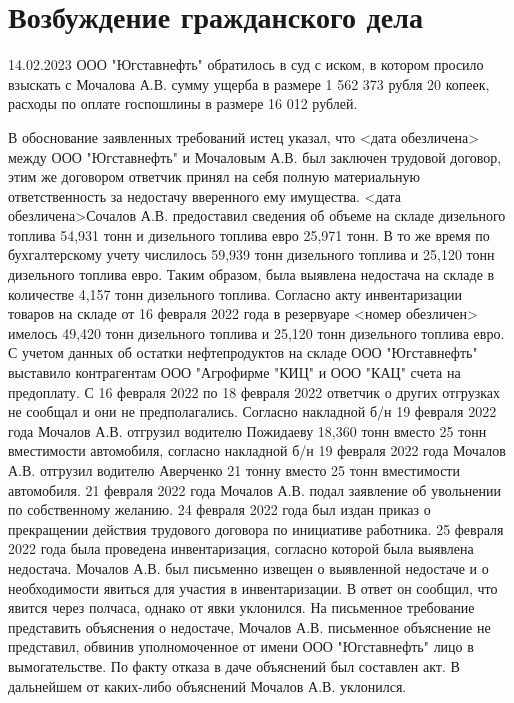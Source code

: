 \documentclass[a4paper]{article}
\begin{document}
	\thispagestyle{empty}
	
	
	
	\newpage
	
	\tableofcontents
	
	\pagestyle{plain}
	
	\newpage
	
	\section{Возбуждение гражданского дела}
		14.02.2023 ООО "Югставнефть" обратилось в суд с иском, в котором просило взыскать с Мочалова А.В. сумму ущерба в размере 1 562 373 рубля 20 копеек, расходы по оплате госпошлины в размере 16 012 рублей.
		
		В обоснование заявленных требований истец указал, что <дата обезличена> между ООО "Югставнефть" и Мочаловым А.В. был заключен трудовой договор, этим же договором ответчик принял на себя полную материальную ответственность за недостачу вверенного ему имущества. <дата обезличена>Сочалов А.В. предоставил сведения об объеме на складе дизельного топлива 54,931 тонн и дизельного топлива евро 25,971 тонн. В то же время по бухгалтерскому учету числилось 59,939 тонн дизельного топлива и 25,120 тонн дизельного топлива евро. Таким образом, была выявлена недостача на складе в количестве 4,157 тонн дизельного топлива. Согласно акту инвентаризации товаров на складе от 16 февраля 2022 года в резервуаре <номер обезличен> имелось 49,420 тонн дизельного топлива и 25,120 тонн дизельного топлива евро. С учетом данных об остатки нефтепродуктов на складе ООО "Югставнефть" выставило контрагентам ООО "Агрофирме "КИЦ" и ООО "КАЦ" счета на предоплату. С 16 февраля 2022 по 18 февраля 2022 ответчик о других отгрузках не сообщал и они не предполагались. Согласно накладной б/н 19 февраля 2022 года Мочалов А.В. отгрузил водителю Пожидаеву 18,360 тонн вместо 25 тонн вместимости автомобиля, согласно накладной б/н 19 февраля 2022 года Мочалов А.В. отгрузил водителю Аверченко 21 тонну вместо 25 тонн вместимости автомобиля. 21 февраля 2022 года Мочалов А.В. подал заявление об увольнении по собственному желанию. 24 февраля 2022 года был издан приказ о прекращении действия трудового договора по инициативе работника. 25 февраля 2022 года была проведена инвентаризация, согласно которой была выявлена недостача. Мочалов А.В. был письменно извещен о выявленной недостаче и о необходимости явиться для участия в инвентаризации. В ответ он сообщил, что явится через полчаса, однако от явки уклонился. На письменное требование представить объяснения о недостаче, Мочалов А.В. письменное объяснение не представил, обвинив уполномоченное от имени ООО "Югставнефть" лицо в вымогательстве. По факту отказа в даче объяснений был составлен акт. В дальнейшем от каких-либо объяснений Мочалов А.В. уклонился.
		
\end{document}
